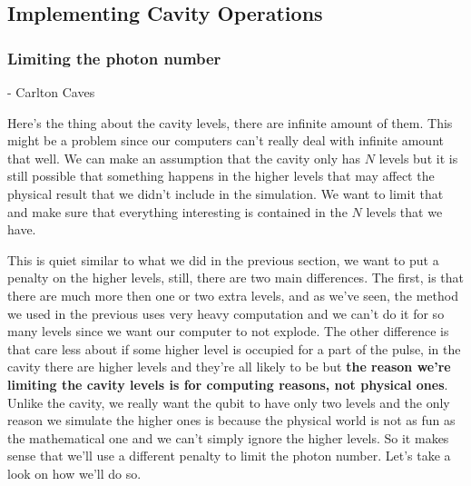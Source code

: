 \documentclass[english, a4paper, 12pt, twoside]{article}
\numberwithin{equation}{section} %
\begin{document}

\subsection{Implementing Cavity Operations}
\subsubsection{Limiting the photon number} 
\centerline{}
\centerline{- Carlton Caves}
Here's the thing about the cavity levels, there are infinite amount of them. This might be a problem since our computers can't really deal with infinite amount that well. We can make an assumption that the cavity only has \(N\) levels but it is still possible that something happens in the higher levels that may affect the physical result that we didn't include in the simulation. We want to limit that and make sure that everything interesting is contained in the \(N\) levels that we have.

This is quiet similar to what we did in the previous section, we want to put a penalty on the higher levels, still, there are two main differences. The first, is that there are much more then one or two extra levels, and as we've seen, the method we used in the previous uses very heavy computation and we can't do it for so many levels since we want our computer to not explode. The other difference is that care less about if some higher level is occupied for a part of the pulse, in the cavity there are higher levels and they're all likely to be but \textbf{the reason we're limiting the cavity levels is for computing reasons, not physical ones}. Unlike the cavity, we really want the qubit to have only two levels and the only reason we simulate the higher ones is because the physical world is not as fun as the mathematical one and we can't simply ignore the higher levels. So it makes sense that we'll use a different penalty to limit the photon number. Let's take a look on how we'll do so. 
\end{document}
